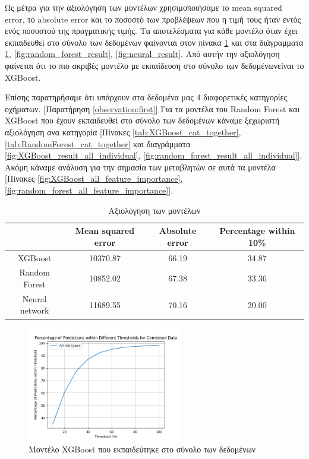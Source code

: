 \documentclass{llncs}
\begin{document}
Ως μέτρα για την αξιολόγηση των μοντέλων χρησιμοποιήσαμε το mean squared error, το absolute error και το ποσοστό των προβλέψεων που η τιμή τους 
ήταν εντός ενός ποσοστού της πραγματικής τιμής. Τα αποτελέσματα για κάθε μοντέλο όταν έχει εκπαιδευθεί στο σύνολο των δεδομένων
φαίνονται στον πίνακα \ref{tab:3x3table} και στα διάγραμματα \ref{fig:XGBoost_result}, 
\ref{fig:random_forest_result}, \ref{fig:neural_result}. 
Από αυτήν την αξιολόγηση φαίνεται ότι το πιο ακριβές μοντέλο 
με εκπαίδευση στο σύνολο των δεδομένωνείναι το XGBoost.

Επίσης παρατηρήσαμε ότι υπάρχουν στα δεδομένα μας 4 διαφορετικές κατηγορίες οχήματων. 
[Παρατήρηση \ref{observation:first}]
Για τα μοντέλα του Random Forest και XGBoost που έχουν εκπαιδευθεί στο σύνολο των δεδομένων
κάναμε ξεχωριστή αξιολόγηση ανα κατηγορία 
[Πίνακες \ref{tab:XGBoost_cat_together}, \ref{tab:RandomForest_cat_together} 
και διαγράμματα 
\ref{fig:XGBoost_result_all_individual}, \ref{fig:random_forest_result_all_individual}].
Ακόμη κάναμε ανάλυση για την σημασία των μεταβλητών σε αυτά τα μοντέλα 
[Πίνακες \ref{fig:XGBoost_all_feature_importance}, 
\ref{fig:random_forest_all_feature_importance}].




\begin{table}
    \centering
    \begin{tabular}{|c|c|c|c|} %
        \hline
         &Mean squared error & Absolute error & Percentage within 10\% \\ %
        \hline
        XGBoost & 10370.87 & 66.19 & 34.87 \\
        Random Forest & 10852.02 & 67.38 & 33.36 \\
        Neural network & 11689.55 & 70.16 & 20.00 \\
        \hline
    \end{tabular}
    \caption{Αξιολόγηση των μοντέλων}
    \label{tab:3x3table}
\end{table}

\begin{figure}
    \begin{center}
        \includegraphics[width=0.6\textwidth]{images/combined_trained_all_thresholds_xgb.png}
    \end{center}
    \caption{Μοντέλο XGBoost που εκπαιδεύτηκε στο σύνολο των δεδομένων}  
    \label{fig:XGBoost_result}  
\end{figure}
\end{document}
